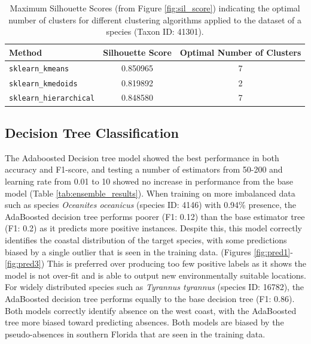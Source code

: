 \documentclass{article}
\begin{document}
\begin{table}[h!]
\centering
\begin{minipage}{\textwidth}
\begin{tabular}{lcc}
\toprule
\textbf{Method} & \textbf{Silhouette Score} & \textbf{Optimal Number of Clusters} \\
\midrule
\texttt{sklearn\_kmeans}       & 0.850965 & 7 \\ 
\texttt{sklearn\_kmedoids}     & 0.819892 & 2 \\ 
\texttt{sklearn\_hierarchical} & 0.848580 & 7 \\ 
\bottomrule
\end{tabular}
\caption{Maximum Silhouette Scores (from Figure \ref{fig:sil_score}) indicating the optimal number of clusters for different clustering algorithms applied to the dataset of a species (Taxon ID: 41301).}
\label{tab:clustering_results}
\end{minipage}
\end{table}


\subsection{Decision Tree Classification}
The Adaboosted Decision tree model showed the best performance in both accuracy and F1-score, and testing a number of estimators from 50-200 and learning rate from 0.01 to 10 showed no increase in performance from the base model (Table \ref{tab:ensemble_results}). When training on more imbalanced data such as species \textit{Oceanites oceanicus} (species ID: 4146) with 0.94\% presence, the AdaBoosted decision tree performs poorer (F1: 0.12) than the base estimator tree (F1: 0.2) as it predicts more positive instances. Despite this, this model correctly identifies the coastal distribution of the target species, with some predictions biased by a single outlier that is seen in the training data. (Figures \ref{fig:pred1}-\ref{fig:pred3}) This is preferred over producing too few positive labels as it shows the model is not over-fit and is able to output new environmentally suitable locations. For widely distributed species such as \textit{Tyrannus tyrannus} (species ID: 16782), the AdaBoosted decision tree performs equally to the base decision tree (F1: 0.86). Both models correctly identify absence on the west coast, with the AdaBoosted tree more biased toward predicting absences. Both models are biased by the pseudo-absences in southern Florida that are seen in the training data.
\end{document}

